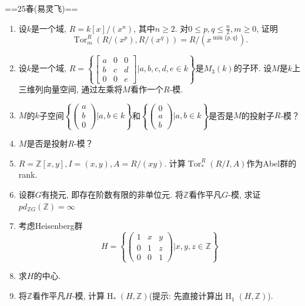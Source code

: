 ==25春(易灵飞)==
\begin{enumerate}
    \item 设$k$是一个域, $R=k[x]/(x^n)$, 其中$n\geq 2$. 对$0\leq p,q \leq \frac{n}{2},m\geq 0$, 证明
    $$\operatorname{Tor}^R_m(R/(x^p),R/(x^q))=R/(x^{\min\{p,q\}}).$$
    
    \item 设$k$是一个域, $R=\left\{ \begin{bmatrix}a&0&0\\b&c&d\\0&0&e \end{bmatrix} |a,b,c,d,e\in k \right\}$是$M_3(k)$的子环.
    设$M$是$k$上三维列向量空间, 通过左乘将$M$看作一个$R$-模.
    \item[(a)]$M$的$k$子空间$\left\{\begin{pmatrix}a\\b\\0\end{pmatrix}|a,b\in k\right\}$和$\left\{\begin{pmatrix}0\\a\\b\end{pmatrix}| a,b\in k\right\}$是否是$M$的投射子$R$-模？
    \item[(b)]$M$是否是投射$R$-模？

    \item $R=\mathbb{Z}[x,y], I=(x,y), A=R/(xy)$. 计算$\operatorname{Tor}^R_*(R/I,A)$作为Abel群的rank.

    \item 设群$G$有挠元, 即存在阶数有限的非单位元. 将$\mathbb{Z}$看作平凡$G$-模, 求证$pd_{\mathbb{Z}G}(\mathbb{Z})=\infty$

    \item 考虑Heisenberg群
    $$H=\left\{ \begin{pmatrix}1&x&y\\0&1&z\\0&0&1\end{pmatrix}|x,y,z\in\mathbb{Z}\right\}$$
    \item[(a)] 求$H$的中心.
    \item[(b)] 将$\mathbb{Z}$看作平凡$H$-模, 计算$\operatorname{H}_*(H,\mathbb{Z})$(提示: 先直接计算出$\operatorname{H}_1(H,\mathbb{Z})$).
\end{enumerate}
